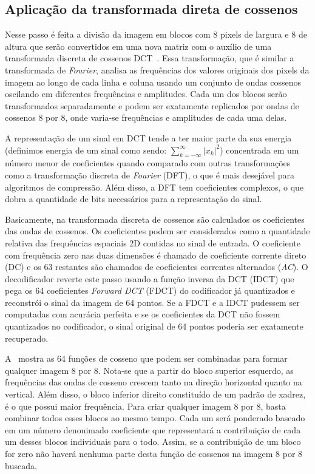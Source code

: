\subsection{Aplicação da transformada direta de cossenos}
Nesse passo é feita a divisão da imagem em blocos com 8 pixels de largura e 8 de altura que serão convertidos em uma nova matriz com o auxílio de uma transformada discreta de cossenos \acrshort{DCT}~\cite{ahmed1974discrete}. Essa transformação, que é similar a transformada de \textit{Fourier}, analisa as frequências dos valores originais dos pixels da imagem ao longo de cada linha e coluna usando um conjunto de ondas cossenos oscilando em diferentes frequências e amplitudes. Cada um dos blocos serão transformados separadamente e podem ser exatamente replicados por ondas de cossenos 8 por 8, onde varia-se frequências e amplitudes de cada uma delas. 

A representação de um sinal em \acrshort{DCT} tende a ter maior parte da sua energia (definimos energia de um sinal como sendo: $\sum_{k = - \infty}^{\infty}{|x_k|}^2$) concentrada em um número menor de coeficientes quando comparado com outras transformações como a transformação discreta de \textit{Fourier} (\acrshort{DFT}), o que é mais desejável para algoritmos de compressão. Além disso, a \acrshort{DFT} tem coeficientes complexos, o que dobra a quantidade de bits necessários para a representação do sinal. 

Basicamente, na transformada discreta de cossenos são calculados os coeficientes das ondas de cossenos. Os coeficientes podem ser considerados como a quantidade relativa das frequências espaciais 2D contidas no sinal de entrada. O coeficiente com frequência zero nas duas dimensões é chamado de coeficiente corrente direto (\acrshort{DC}) e os 63 restantes são chamados de coeficientes correntes alternados (\textit{AC}). O decodificador reverte este passo usando a função inversa da DCT (\acrshort{IDCT}) que pega os 64 coeficientes \textit{Forward DCT} (\acrshort{FDCT}) do codificador já quantizados e reconstrói o sinal da imagem de 64 pontos. Se a \acrshort{FDCT} e a \acrshort{IDCT} pudessem ser computadas com acurácia perfeita e se os coeficientes da \acrshort{DCT} não fossem quantizados no codificador, o sinal original de 64 pontos poderia ser exatamente recuperado.

A~ mostra as 64 funções de cosseno que podem ser combinadas para formar qualquer imagem 8 por 8. Nota-se que a partir do bloco superior esquerdo, as frequências das ondas de cosseno crescem tanto na direção horizontal quanto na vertical. Além disso, o bloco inferior direito constituído de um padrão de xadrez, é o que possui maior frequência. Para criar qualquer imagem 8 por 8, basta combinar todos esses blocos ao mesmo tempo. Cada um será ponderado baseado em um número denonimado coeficiente que representará a contribuição de cada um desses blocos individuais para o todo. Assim, se a contribuição de um bloco for zero não haverá nenhuma parte desta função de cossenos na imagem 8 por 8 buscada. 

